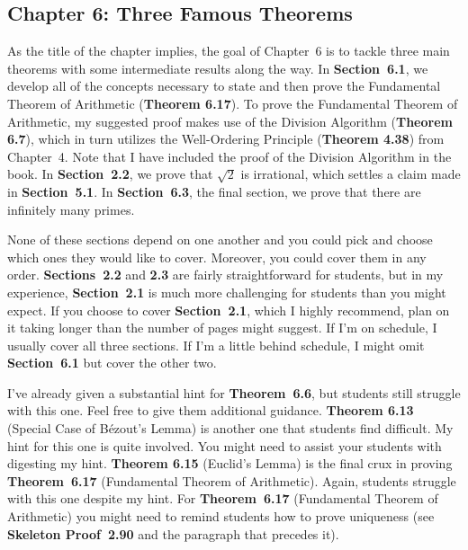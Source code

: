 \documentclass[11pt]{article}%
\newcommand{\blankline}{\pagebreak[2]\vspace{.5\baselineskip}}
\begin{document}
\subsection*{Chapter 6: Three Famous Theorems}

As the title of the chapter implies, the goal of Chapter~6 is to tackle three main theorems with some intermediate results along the way.  In \textbf{Section~6.1}, we develop all of the concepts necessary to state and then prove the Fundamental Theorem of Arithmetic (\textbf{Theorem 6.17}). To prove the Fundamental Theorem of Arithmetic, my suggested proof makes use of the Division Algorithm (\textbf{Theorem 6.7}), which in turn utilizes the Well-Ordering Principle (\textbf{Theorem 4.38}) from Chapter~4. Note that I have included the proof of the Division Algorithm in the book. In \textbf{Section~2.2}, we prove that $\sqrt{2}$ is irrational, which settles a claim made in \textbf{Section~5.1}. In \textbf{Section~6.3}, the final section, we prove that there are infinitely many primes.  

\blankline

None of these sections depend on one another and you could pick and choose which ones they would like to cover.  Moreover, you could cover them in any order.  \textbf{Sections~2.2} and \textbf{2.3} are fairly straightforward for students, but in my experience, \textbf{Section~2.1} is much more challenging for students than you might expect.  If you choose to cover  \textbf{Section~2.1}, which I highly recommend, plan on it taking longer than the number of pages might suggest.  If I'm on schedule, I usually cover all three sections.  If I'm a little behind schedule, I might omit \textbf{Section~6.1} but cover the other two.

\blankline

I've already given a substantial hint for \textbf{Theorem~6.6}, but students still struggle with this one.  Feel free to give them additional guidance.  \textbf{Theorem 6.13} (Special Case of B\'ezout's Lemma) is another one that students find difficult.  My hint for this one is quite involved.  You might need to assist your students with digesting my hint.  \textbf{Theorem 6.15} (Euclid's Lemma) is the final crux in proving \textbf{Theorem~6.17} (Fundamental Theorem of Arithmetic).  Again, students struggle with this one despite my hint.  For \textbf{Theorem~6.17} (Fundamental Theorem of Arithmetic) you might need to remind students how to prove uniqueness (see \textbf{Skeleton Proof~2.90} and the paragraph that precedes it).
\end{document}
